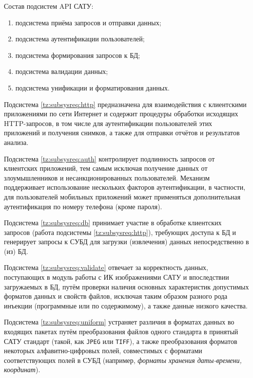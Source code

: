 \par

	Состав подсистем API САТУ:

	\begin{enumerate}
		\item подсистема приёма запросов и отправки данных; \label{tz:subsysreq:http}
		\item подсистема аутентификации пользователей; \label{tz:subsysreq:auth}
		\item подсистема формирования запросов к БД; \label{tz:subsysreq:db}
		\item подсистема валидации данных; \label{tz:subsysreq:validate}
		\item подсистема унификации и форматирования данных. \label{tz:subsysreq:uniform}
	\end{enumerate}

	Подсистема \ref{tz:subsysreq:http} предназначена для взаимодействия с клиентскими приложениями по сети Интернет и содержит процедуры обработки исходящих HTTP-запросов, в том числе для аутентификации пользователей этих приложений и получения снимков, а также для отправки отчётов и результатов анализа.

	Подсистема \ref{tz:subsysreq:auth} контролирует подлинность запросов от клиентских приложений, тем самым исключая получение данных от злоумышленников и несанкционированных пользователей. Механизм поддерживает использование нескольких факторов аутентификации, в частности, для пользователей мобильных приложений может применяться дополнительная аутентификация по номеру телефона (кроме пароля).

	Подсистема \ref{tz:subsysreq:db} принимает участие в обработке клиентских запросов (работа подсистемы \ref{tz:subsysreq:http}), требующих доступа к БД и генерирует запросы к СУБД для загрузки (извлечения) данных непосредственно в (из) БД.

	Подсистема \ref{tz:subsysreq:validate} отвечает за корректность данных, поступающих в модуль работы с ИК изображениями САТУ и впоследствии загружаемых в БД, путём проверки наличия основных характеристик допустимых форматов данных и свойств файлов, исключая таким образом разного рода инъекции (программные или по содержимому), а также данные низкого качества.

	Подсистема \ref{tz:subsysreq:uniform} устраняет различия в форматах данных во входящих пакетах путём преобразования файлов одного стандарта в принятый САТУ стандарт (такой, как \texttt{JPEG} или \texttt{TIFF}), а также преобразования форматов некоторых алфавитно-цифровых полей, совместимых с форматами соответствующих полей в СУБД (например, \textit{форматы хранения даты-времени, координат}).

